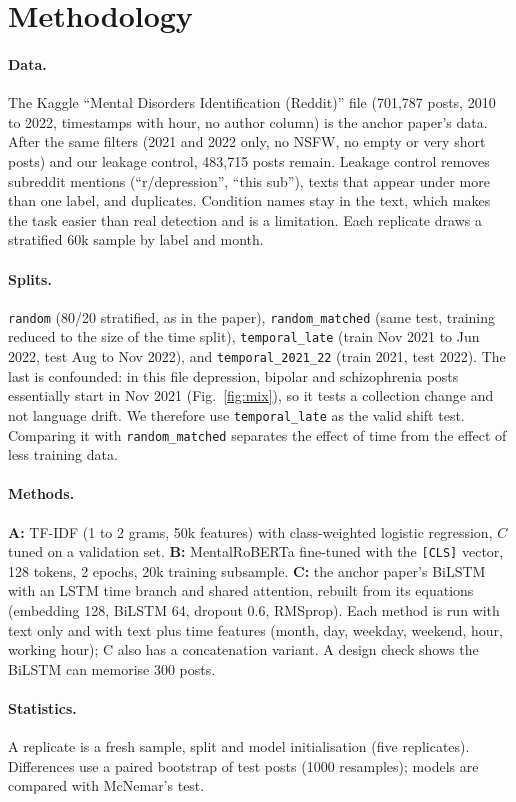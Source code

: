 \documentclass[10pt,twocolumn]{article}
\begin{document}
\section{Methodology}
\paragraph{Data.} The Kaggle ``Mental Disorders Identification (Reddit)'' file (701,787 posts, 2010 to 2022, timestamps with hour, no author column) is the anchor paper's data. After the same filters (2021 and 2022 only, no NSFW, no empty or very short posts) and our leakage control, 483,715 posts remain. Leakage control removes subreddit mentions (``r/depression'', ``this sub''), texts that appear under more than one label, and duplicates. Condition names stay in the text, which makes the task easier than real detection and is a limitation. Each replicate draws a stratified 60k sample by label and month.
\paragraph{Splits.} \texttt{random} (80/20 stratified, as in the paper), \texttt{random\_matched} (same test, training reduced to the size of the time split), \texttt{temporal\_late} (train Nov 2021 to Jun 2022, test Aug to Nov 2022), and \texttt{temporal\_2021\_22} (train 2021, test 2022). The last is confounded: in this file depression, bipolar and schizophrenia posts essentially start in Nov 2021 (Fig.~\ref{fig:mix}), so it tests a collection change and not language drift. We therefore use \texttt{temporal\_late} as the valid shift test. Comparing it with \texttt{random\_matched} separates the effect of time from the effect of less training data.
\paragraph{Methods.} \textbf{A:} TF-IDF (1 to 2 grams, 50k features) with class-weighted logistic regression, $C$ tuned on a validation set. \textbf{B:} MentalRoBERTa fine-tuned with the \texttt{[CLS]} vector, 128 tokens, 2 epochs, 20k training subsample. \textbf{C:} the anchor paper's BiLSTM with an LSTM time branch and shared attention, rebuilt from its equations (embedding 128, BiLSTM 64, dropout 0.6, RMSprop). Each method is run with text only and with text plus time features (month, day, weekday, weekend, hour, working hour); C also has a concatenation variant. A design check shows the BiLSTM can memorise 300 posts.
\paragraph{Statistics.} A replicate is a fresh sample, split and model initialisation (five replicates). Differences use a paired bootstrap of test posts (1000 resamples); models are compared with McNemar's test.
\end{document}
